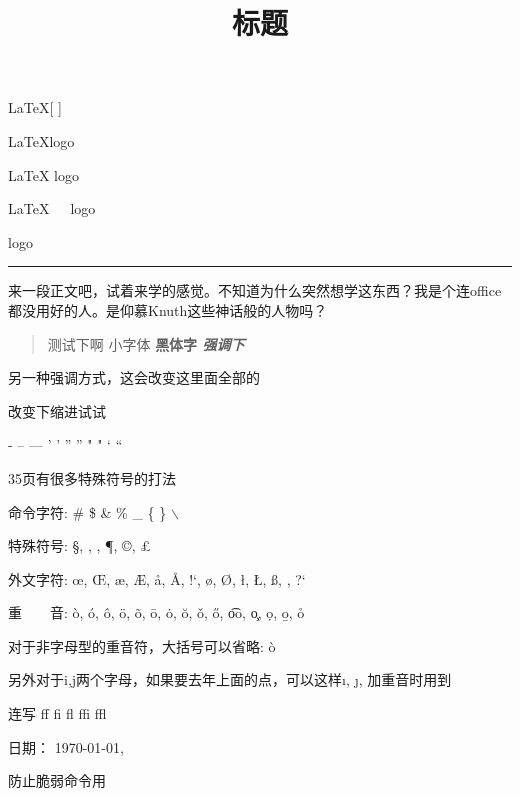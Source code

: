 \documentclass[a4paper]{article}
\begin{document}
  

\LaTeX {[} {]}

\LaTeX logo

\LaTeX{} logo

\LaTeX \ \ \  logo

{\LaTeXe} logo

\rule[12mm]{10mm}{5mm}

来一段正文吧，试着来学\LaTeXe 的感觉。不知道为什么突然想学这东西？我是个连office都没用好的人。是仰慕Knuth这些神话般的人物吗？
\begin{quote}
	测试下啊 \small 小字体 \bfseries 黑体字 \em 强调下
\end{quote}

\begin{em}
	另一种强调方式，这会改变这里面全部的

	\setlength{\parindent}{2cm} 改变下缩进试试
\end{em}


- -- --- ' ' '' '' " " ` ``

35页有很多特殊符号的打法

命令字符: \# \$ \& \% \_ \{ \} $\backslash$

特殊符号: \S, \dag, \ddag, \P, \copyright, \pounds

外文字符: \oe, \OE, \ae, \AE, \aa, \AA, !`, \o, \O, \l, \L, \ss, \SS, ?`

重\ \ \ \ 音: \`{o}, \'{o}, \^{o}, \"{o}, \~{o}, \={o}, \.{o}, \u{o},
\v{o}, \H{o}, \t{oo}, \c{o}, \d{o}, \b{o}, \r{o}

对于非字母型的重音符，大括号可以省略: \`o

另外对于i,j两个字母，如果要去年上面的点，可以这样\i, \j, 加重音时用到

连写 ff fi fl ffi ffl

日期： \today, %

防止脆弱命令用\protect \title{标题}
\end{document}

